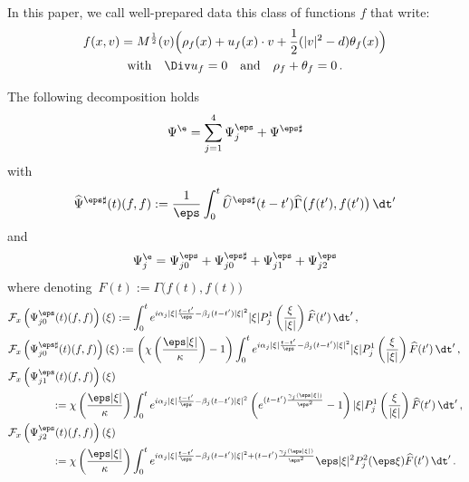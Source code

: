 In this paper, we call {well-prepared data} this class of functions $f$ that write:
\begin{multline}\label{defwp}
f (x,v) = M^\frac12(v)\Big(\rho_{f} (x) + u_{f}(x) \cdot v + \frac12(|v|^2- d) \theta_{f} (x)\Big) \\
\text{with} \quad \Div u_f = 0 \quad \text{and} \quad \rho_f+ \theta_f = 0 \,.
\end{multline}


\begin{lemm}\label{estimatePsiepslimitPsi0}
The following decomposition holds
\[
\Psi^\e = \sum_{j=1}^4 \Psi^\eps_j + \Psi^{\eps \sharp}
\]
with
\[
\widehat \Psi^{\eps \sharp}(t)(f,f):=\frac{1}{\eps} \int_0^t \widehat U^{\eps\sharp}(t-t') \widehat \Gamma \big(f(t'),f(t')\big) \, \dt'
\]
and
\begin{equation}\label{decompositionPsiappendix}
\Psi^\e_j = \Psi^\eps_{j0} + \Psi^{\eps \sharp}_{j0} + \Psi^\eps_{j1} + \Psi^\eps_{j2}
\end{equation}
where denoting~$F(t) := \Gamma \big(f(t),f(t)\big)$
\begingroup
\allowdisplaybreaks
\begin{align*}
&\mathcal{F}_x \left(\Psi^\eps_{j0}(t)(f,f)\right)(\xi) := \int_0^t e^{i\alpha_j |\xi|\frac{t-t'}{\eps} - \beta_j (t-t') |\xi|^2} |\xi|P_{j}^1\left(\frac{\xi}{|\xi|}\right) \widehat F(t') \, \dt' \,, \\
&\mathcal{F}_x \left(\Psi^{\eps\sharp}_{j0}(t)(f,f)\right)(\xi):= \left(\chi\left (\frac{\eps|\xi|}\kappa\right)-1\right) \int_0^te^{i\alpha_j |\xi|\frac{t-t'}{\eps} - \beta_j (t-t') |\xi|^2}|\xi|P_{j}^1\left(\frac{\xi}{|\xi|}\right) \widehat F(t') \, \dt' \,,\\
&\mathcal{F}_x \left(\Psi^\eps_{j1}(t)(f,f)\right)(\xi) \\*
&\qquad\qquad := \chi\left (\frac{\eps|\xi|}\kappa\right) \int_0^te^{i\alpha_j |\xi|\frac{t-t'}{\eps} - \beta_j (t-t') |\xi|^2} \left(e^{(t-t') \frac{\gamma_j(\eps|\xi|)}{\eps^2}}-1 \right)|\xi|P_{j}^1\left(\frac{\xi}{|\xi|}\right) \widehat F(t') \, \dt'\,, \\
&\mathcal{F}_x \left(\Psi^\eps_{j2}(t)(f,f)\right)(\xi) \\*
&\qquad\qquad := \chi\left (\frac{\eps|\xi|}\kappa\right) \int_0^te^{i\alpha_j |\xi|\frac{t-t'}{\eps} - \beta_j (t-t') |\xi|^2+ (t-t') \frac{\gamma_j(\eps|\xi|)}{\eps^2}} \eps |\xi|^2P^2_j(\eps\xi) \widehat F(t') \, \dt'
\,.
\end{align*}
\endgroup
\end{lemm}

